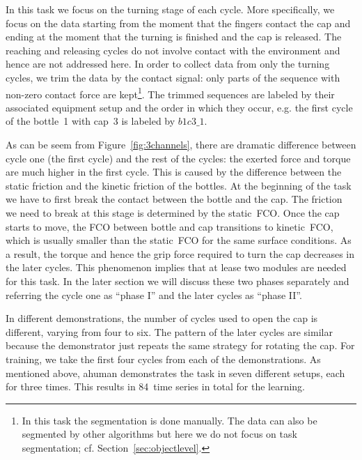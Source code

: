In this task we focus on the turning stage of each cycle. More
specifically, we focus on the data starting from the moment that the
fingers contact the cap and ending at the moment that the turning is
finished and the cap is released. The reaching and releasing cycles do
not involve contact with the environment and hence are not addressed
here.
In order to collect data from only the turning cycles, we trim the
data by the contact signal: only parts of the sequence with non-zero
contact force are kept\footnote{In this task the segmentation is
  done manually. The data can also be segmented by other algorithms
  but here we do not focus on task segmentation; cf. Section~\ref{sec:objectlevel}.}. The trimmed
sequences are labeled by their associated equipment setup and the
order in which they occur, e.g. the first cycle of the bottle~1 with
cap~3 is labeled by $b1c3\_1$.

As can be seem from Figure~\ref{fig:3channels}, there are dramatic
difference between cycle one (the first cycle) and the rest of the
cycles: the exerted force and torque are much higher in the first
cycle. This is caused by the difference between the static friction
and the kinetic friction of the bottles. At the beginning of the task
we have to first break the contact between the bottle and the cap. The
friction we need to break at this stage is determined by the
static~FCO. Once the cap starts to move, the FCO between bottle and
cap transitions to kinetic~FCO, which is usually smaller than the
static~FCO for the same surface conditions. As a result, the torque and
hence the grip force required to turn the cap decreases in the later
cycles. This phenomenon implies that at lease two modules are needed
for this task. In the later section we will discuss these two phases
separately and referring the cycle one as ``phase I'' and the later cycles
as ``phase II''.

In different demonstrations, the number of cycles used to open the cap is different, varying from four to six. The pattern of the later
cycles are similar because the demonstrator just repeats the same strategy for rotating the cap. For training, we take the first four cycles from each of the demonstrations. As mentioned above, ahuman demonstrates the task in seven different setups, each for three times. This results in 84~time series in total for the learning.

